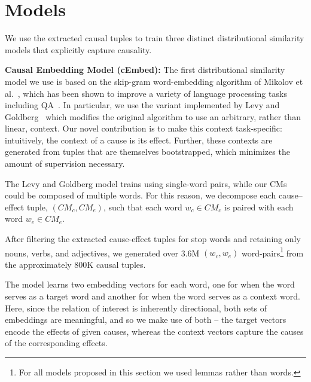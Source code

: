 \section{Models}
\label{sec-emnlp2016:models}

We use the extracted causal tuples to train three distinct distributional similarity models that explicitly capture causality. 

{\flushleft \textbf{Causal Embedding Model (cEmbed):}}
The first distributional similarity model we use is based on the skip-gram word-embedding algorithm of Mikolov et al.~\citeyear{mikolov2013distributed}, which has been shown to improve a variety of language processing tasks %
including QA~\cite{yih13,fried2015higher}.  In particular, we use the variant implemented by Levy and Goldberg~\citeyear{levy2014dependency} which modifies the original algorithm to use an arbitrary, rather than linear, context. 
Our novel contribution is to make this context task-specific: intuitively, the context of a cause is its effect. Further, these contexts are generated from tuples that are themselves bootstrapped, which minimizes the amount of supervision necessary.

The Levy and Goldberg model trains using single-word pairs, while our CMs could be composed of multiple words.  
For this reason, we decompose each cause--effect tuple, $(CM_c,CM_e)$, such that each word $w_c \in CM_c$ is paired with each word $w_e \in CM_e$. 

After filtering the extracted cause-effect tuples for stop words and retaining only nouns, verbs, and adjectives, we generated over 3.6M $(w_c, w_e)$ word-pairs\footnote{For all models proposed in this section we used lemmas rather than words.} from the approximately 800K causal tuples.

The model learns two embedding vectors for each word, one for when the word serves as a target word and another for when the word serves as a context word.  Here, since the relation of interest is inherently directional, both sets of embeddings are meaningful, and so we make use of both -- the target vectors encode the effects of given causes, whereas the context vectors capture the causes of the corresponding effects. 


